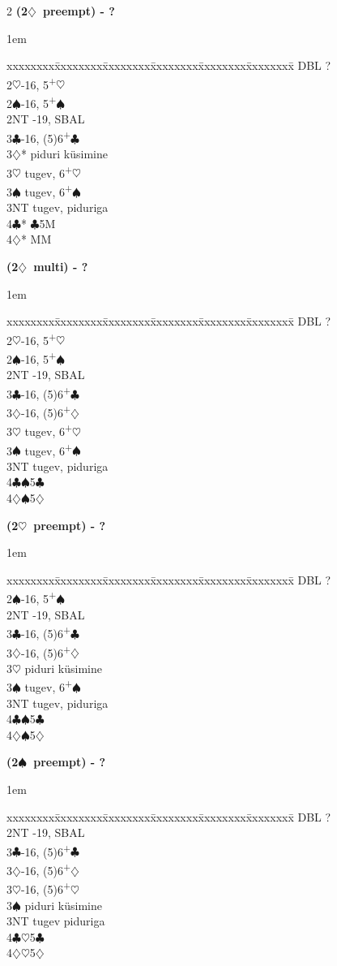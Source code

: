 \documentclass[10pt]{article}
\renewcommand{\c}{$\clubsuit$}
\renewcommand{\d}{$\diamondsuit$}
\newcommand{\h}{$\heartsuit$}
\newcommand{\s}{$\spadesuit$}
\newcommand{\p}{\textsuperscript{+}}
\newcommand{\x}{DBL}
\newenvironment{bidtable}[1][]
{\textbf{#1}
  \begin{adjustwidth}{1em}{}
    \addvspace{2pt}
    \begin{tabbing}
      xxxxxxxx\=xxxxxxxx\=xxxxxxxx\=xxxxxxxx\=xxxxxxxx\=xxxxxxxx\=\kill}
{\end{tabbing}\end{adjustwidth}\bigskip}%
\begin{document}
\begin{multicols*}{2}
\begin{bidtable}[(2\d\ preempt) - ?]
\x   \> ?               \\
2\h  {}-16, 5\p\h    \\
2\s  {}-16, 5\p\s    \\
2NT  -19, SBAL     \\
3\c  {}-16, (5)6\p\c \\
3\d* \> piduri küsimine \\
3\h  \> tugev, 6\p\h    \\
3\s  \> tugev, 6\p\s    \\
3NT  \> tugev, piduriga \\
4\c* {}\c 5M          \\
4\d* {} MM
\end{bidtable}

\begin{bidtable}[(2\d\ multi) - ?]
\x  \> ?               \\
2\h {}-16, 5\p\h    \\
2\s {}-16, 5\p\s    \\
2NT -19, SBAL     \\
3\c {}-16, (5)6\p\c \\
3\d {}-16, (5)6\p\d \\
3\h \> tugev, 6\p\h    \\
3\s \> tugev, 6\p\s    \\
3NT \> tugev, piduriga \\
4\c {}\s 5\c         \\
4\d {}\s 5\d
\end{bidtable}

\begin{bidtable}[(2\h\ preempt) - ?]
\x  \> ?               \\
2\s {}-16, 5\p\s    \\
2NT -19, SBAL     \\
3\c {}-16, (5)6\p\c \\
3\d {}-16, (5)6\p\d \\
3\h \> piduri küsimine \\
3\s \> tugev, 6\p\s    \\
3NT \> tugev, piduriga \\
4\c {}\s 5\c         \\
4\d {}\s 5\d
\end{bidtable}


\begin{bidtable}[(2\s\ preempt) - ?]
\x  \> ?               \\
2NT -19, SBAL     \\
3\c {}-16, (5)6\p\c \\
3\d {}-16, (5)6\p\d \\
3\h {}-16, (5)6\p\h \\
3\s \> piduri küsimine \\
3NT \> tugev piduriga  \\
4\c {}\h 5\c         \\
4\d {}\h 5\d
\end{bidtable}


\end{multicols*}
\end{document}
